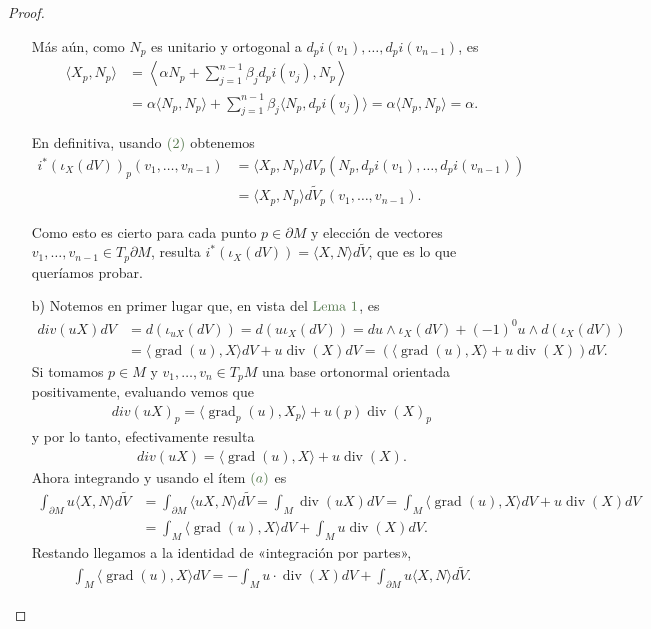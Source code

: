 \documentclass[11pt]{article}
\renewcommand{\div}{\operatorname{div}}
\newcommand{\grad}{\operatorname{grad}}
\newcommand{\ip}[1]{\langle #1 \rangle}
\newcommand{\paint}[1]{\color{color}{#1}}
\begin{document}
\begin{proof}
\begin{itemize}[listparindent = \parindent]
Más aún, como $N_p$ es unitario y ortogonal a $d_pi(v_1), \dots, d_pi(v_{n-1})$, es
\begin{align*}
\ip{X_p,N_p} &= \left\ip{\alpha N_p + \sum_{j=1}^{n-1}\beta_j d_pi(v_j), N_p\right}\\
&= \alpha\ip{N_p,N_p}+ \sum_{j=1}^{n-1}\beta_j \ip{N_p,d_pi(v_j)} = \alpha\ip{N_p,N_p} = \alpha.
\end{align*}

En definitiva, usando $\paint{(2)}$ obtenemos
\begin{align*}
i^*(\iota_X(dV))_p(v_1, \dots, v_{n-1}) &= \ip{X_p,N_p}dV_p\left(N_p,d_pi(v_1), \dots, d_pi(v_{n-1})\right)\\
&= \ip{X_p,N_p}d\tilde{V}_p(v_1, \dots, v_{n-1}).
\end{align*}

Como esto es cierto para cada punto $p \in \partial M$ y elección de vectores $v_1, \dots, v_{n-1} \in T_p \partial M$, resulta $i^*(\iota_X(dV)) = \ip{X,N}d\tilde{V}$, que es lo que queríamos probar.
\item[b)] Notemos en primer lugar que, en vista del $\paint{\text{Lema $1$}}$, es
\begin{align*}
div(uX)dV &= d(\iota_{uX}(dV)) = d(u\iota_{X}(dV)) = du \wedge \iota_X(dV) + (-1)^0 u \wedge d(\iota_X(dV))\\
&= \ip{\grad(u),X}dV + u\div(X)dV = (\ip{\grad(u),X}+ u\div(X))dV.
\end{align*}
Si tomamos $p \in M$ y $v_1, \dots, v_n \in T_pM$ una base ortonormal orientada positivamente, evaluando vemos que
\begin{align*}
div(uX)_p = \ip{\grad_p(u),X_p}+ u(p)\div(X)_p
\end{align*}
y por lo tanto, efectivamente resulta
\begin{align*}
div(uX) = \ip{\grad(u),X}+ u\div(X).
\end{align*}
Ahora integrando y usando el ítem $\paint{(a)}$ es
\begin{align*}
\int_{\partial M}u\ip{X,N} d\tilde{V} &= \int_{\partial M}\ip{uX,N} d\tilde{V} = \int_{M}\div(uX)dV= \int_M\ip{\grad(u),X}dV+ u\div(X)dV\\
& = \int_M\ip{\grad(u),X}dV+ \int_M u\div(X)dV.
\end{align*}
Restando llegamos a la identidad de «integración por partes»,
\begin{align*}
\int_M\ip{\grad(u),X} dV  
        = -\int_M u\cdot\div(X) dV
          +\int_{\partial M}u\ip{X,N} d\tilde V.
\end{align*}
\end{itemize}
\end{proof}
\end{document}
